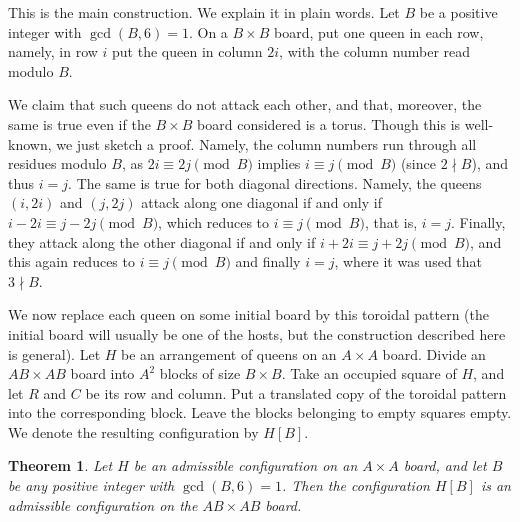 \documentclass[10pt,a4paper]{article}
\newtheorem{theorem}{Theorem}[section]
\theoremstyle{definition}
\begin{document}
This is the main construction. We explain it in plain words. Let $B$ be a positive integer with $\gcd(B,6)=1$. On a $B\times B$ board, put one queen in each row, namely, in row $i$ put the queen in column $2i$, with the column number read modulo $B$.

We claim that such queens do not attack each other, and that, moreover, the same is true even if the $B\times B$ board considered is a torus. Though this is well-known, we just sketch a proof. Namely, the column numbers run through all residues modulo $B$, as $2i\equiv 2j\pmod{B}$ implies $i\equiv j\pmod B$ (since $2\nmid B$), and thus $i=j$. The same is true for both diagonal directions. Namely, the queens $(i,2i)$ and $(j,2j)$ attack along one diagonal if and only if $i-2i\equiv j-2j\pmod{B}$, which reduces to $i\equiv j\pmod B$, that is, $i=j$. Finally, they attack along the other diagonal if and only if $i+2i\equiv j+2j\pmod B$, and this again reduces to $i\equiv j\pmod B$ and finally $i=j$, where it was used that $3\nmid B$.

We now replace each queen on some initial board by this toroidal pattern (the initial board will usually be one of the hosts, but the construction described here is general). Let $H$ be an arrangement of queens on an $A\times A$ board. Divide an $AB\times AB$ board into $A^2$ blocks of size $B\times B$. Take an occupied square of $H$, and let $R$ and $C$ be its row and column. Put a translated copy of the toroidal pattern into the corresponding block. Leave the blocks belonging to empty squares empty. We denote the resulting configuration by $H[B]$. 

\begin{theorem}
\label{substthm}
Let $H$ be an admissible configuration on an $A\times A$ board, and let $B$ be any positive integer with $\gcd(B,6)=1$. Then the configuration $H[B]$ is an admissible  configuration on the $AB\times AB$ board.
\end{theorem}
\end{document}
